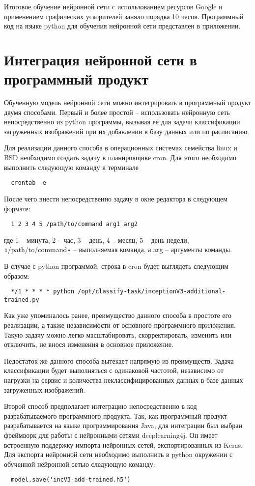 Итоговое обучение нейронной сети с использованием ресурсов Google и применением графических ускорителей заняло порядка 10 часов. 
Программный код на языке python для обучения нейронной сети представлен в приложении.

\section{Интеграция нейронной сети в программный продукт}

Обученную модель нейронной сети можно интегрировать в программный продукт двумя способами. 
Первый и более простой – использовать нейронную сеть непосредственно из python программы, вызывая ее для задачи классификации загруженных изображений при их добавлении в базу данных или по расписанию.


Для реализации данного способа в операционных системах семейства linux и BSD необходимо создать задачу в планировщике cron. 
Для этого необходимо выполнить следующую команду в терминале
\begin{lstlisting}
  crontab -e
\end{lstlisting}
После чего внести непосредственно задачу в окне редактора в следующем формате:
\begin{lstlisting}
  1 2 3 4 5 /path/to/command arg1 arg2
\end{lstlisting}
где 1 – минута, 2 – час, 3 – день, 4 – месяц, 5 – день недели, «/path/to/command» – выполняемая команда, а arg – аргументы команды.


В случае с python программой, строка в cron будет выглядеть следующим образом:
\begin{lstlisting}
  */1 * * * * python /opt/classify-task/inceptionV3-additional-trained.py
\end{lstlisting}

Как уже упоминалось ранее, преимущество данного способа в простоте его реализации, а также независимости от основного программного приложения. 
Такую задачу можно легко масштабировать, скорректировать, изменить или отключить, не внося изменения в основное приложение.


Недостаток же данного способа вытекает напрямую из преимуществ. 
Задача классификации будет выполняться с одинаковой частотой, независимо от нагрузки на сервис и количества неклассифицированных данных в базе данных загруженных изображений.


Второй способ предполагает интеграцию непосредственно в код разрабатываемого программного продукта. 
Так, как программный продукт разрабатывается на языке программирования Java, для интеграции был выбран фреймворк для работы с нейронными сетями deeplearning4j. 
Он имеет встроенную поддержку импорта нейронных сетей, экспортированных из Keras. 
Для экспорта нейронной сети необходимо выполнить в python окружении с обученной нейронной сетью следующую команду:
\begin{lstlisting}
  model.save('incV3-add-trained.h5')
\end{lstlisting}

